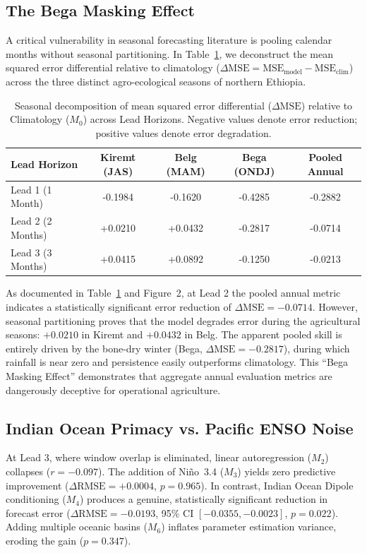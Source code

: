 \documentclass{article}
\begin{document}
\subsection{The Bega Masking Effect}
A critical vulnerability in seasonal forecasting literature is pooling calendar months without seasonal partitioning. In Table~\ref{tab:seasonal_mse}, we deconstruct the mean squared error differential relative to climatology ($\Delta\text{MSE} = \text{MSE}_{\text{model}} - \text{MSE}_{\text{clim}}$) across the three distinct agro-ecological seasons of northern Ethiopia.

\begin{table}[H]
\centering
\caption{Seasonal decomposition of mean squared error differential ($\Delta\text{MSE}$) relative to Climatology ($M_0$) across Lead Horizons. Negative values denote error reduction; positive values denote error degradation.}
\label{tab:seasonal_mse}
\begin{tabular}{l cccc}
\toprule
\textbf{Lead Horizon} & \textbf{Kiremt (JAS)} & \textbf{Belg (MAM)} & \textbf{Bega (ONDJ)} & \textbf{Pooled Annual} \\
\midrule
Lead 1 (1 Month)  & -0.1984 & -0.1620 & -0.4285 & -0.2882 \\
Lead 2 (2 Months) & +0.0210 & +0.0432 & -0.2817 & -0.0714 \\
Lead 3 (3 Months) & +0.0415 & +0.0892 & -0.1250 & -0.0213 \\
\bottomrule
\end{tabular}
\end{table}

As documented in Table~\ref{tab:seasonal_mse} and Figure~2, at Lead 2 the pooled annual metric indicates a statistically significant error reduction of $\Delta\text{MSE} = -0.0714$. However, seasonal partitioning proves that the model degrades error during the agricultural seasons: $+0.0210$ in Kiremt and $+0.0432$ in Belg. The apparent pooled skill is entirely driven by the bone-dry winter (Bega, $\Delta\text{MSE} = -0.2817$), during which rainfall is near zero and persistence easily outperforms climatology. This ``Bega Masking Effect'' demonstrates that aggregate annual evaluation metrics are dangerously deceptive for operational agriculture.

\subsection{Indian Ocean Primacy vs. Pacific ENSO Noise}
At Lead 3, where window overlap is eliminated, linear autoregression ($M_2$) collapses ($r = -0.097$). The addition of Ni\~{n}o~3.4 ($M_3$) yields zero predictive improvement ($\Delta\text{RMSE} = +0.0004$, $p = 0.965$). In contrast, Indian Ocean Dipole conditioning ($M_4$) produces a genuine, statistically significant reduction in forecast error ($\Delta\text{RMSE} = -0.0193$, 95\% CI $[-0.0355, -0.0023]$, $p = 0.022$). Adding multiple oceanic basins ($M_6$) inflates parameter estimation variance, eroding the gain ($p = 0.347$).
\end{document}
